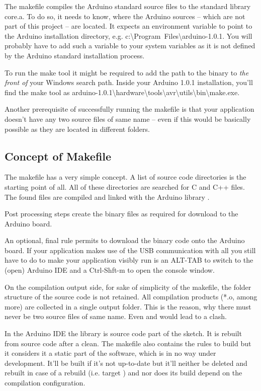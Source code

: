 The makefile compiles the Arduino standard source files to the standard
library core.a. To do so, it needs to know, where the Arduino sources
-- which are not part of this project -- are located. It expects an
environment variable  to point to the Arduino
installation directory, e.g.
c:\textbackslash{}Program~Files\textbackslash\-arduino-1.0.1. You will
probably have to add such a variable to your system variables as it is not
defined by the Arduino standard installation process.

To run the make tool it might be required to add the path to the binary to
\emph{the front of} your Windows search path. Inside your Arduino 1.0.1
installation, you'll find the make tool as
arduino-1.0.1\textbackslash\-hard\-ware\textbackslash\-tools\textbackslash\-avr\textbackslash\-utils\textbackslash\-bin\textbackslash\-make.exe.

Another prerequisite of successfully running the makefile is that your
application doesn't have any two source files of same name -- even if this
would be basically possible as they are located in different folders.


\subsection{Concept of Makefile}

The makefile has a very simple concept. A list of source code directories
is the starting point of all. All of these directories are searched for C
and C++ files. The found files are compiled and linked with the Arduino
library .

Post processing steps create the binary files as required for download to
the Arduino board.

An optional, final rule permits to download the binary code onto the
Arduino board. If your application makes use of the USB communication with
 all you still have to do to make your application visibly
run is an ALT-TAB to switch to the (open) Arduino IDE and a Ctrl-Shft-m to
open the console window.

On the compilation output side, for sake of simplicity of the makefile,
the folder structure of the source code is not retained. All compilation
products (*.o, among more) are collected in a single output folder. This
is the reason, why there must never be two source files of same name. Even
 and  would lead to a clash.

In the Arduino IDE the library  is source code part of the
sketch. It is rebuilt from source code after a clean. The \rtos{} makefile
also contains the rules to build  but it considers it a
static part of the software, which is in no way under development. It'll
be built if it's not up-to-date but it'll neither be deleted and rebuilt
in case of a rebuild (i.e. target ) and nor does its build
depend on the compilation configuration.


